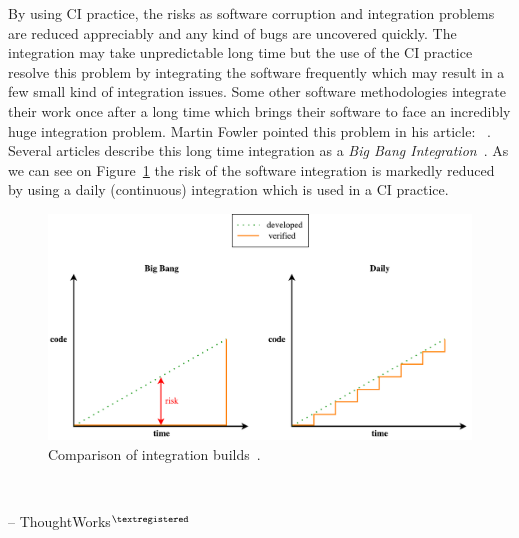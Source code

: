 By using CI practice, the risks as software corruption and integration problems are reduced appreciably and any kind of bugs are uncovered quickly. The integration may take unpredictable long time but the use of the CI practice resolve this problem by integrating the software frequently which may result in a few small kind of integration issues. Some other software methodologies integrate their work once after a long time which brings their software to face an incredibly huge integration problem. Martin Fowler pointed this problem in his article: ~\cite{MartinFowler}. Several articles describe this long time integration as a \textit{Big Bang Integration}~\cite{AaltoUniversity}. As we can see on Figure~\ref{fig:integration} the risk of the software integration is markedly reduced by using a daily (continuous) integration which is used in a CI practice.

\begin{figure}[H]
    \centering
    \includegraphics[scale=0.5]{img/big_bang_vs_daily_build.pdf}
    \caption{Comparison of integration builds~\cite{AaltoUniversity}.}
    \label{fig:integration}
\end{figure}

\begin{displayquote}
    \textit{}\\[-2em]
    \begin{flushright}
        -- ThoughtWorks$^{\tiny{\textregistered}}$~\cite{ThoughtWorks}
    \end{flushright}
\end{displayquote}

